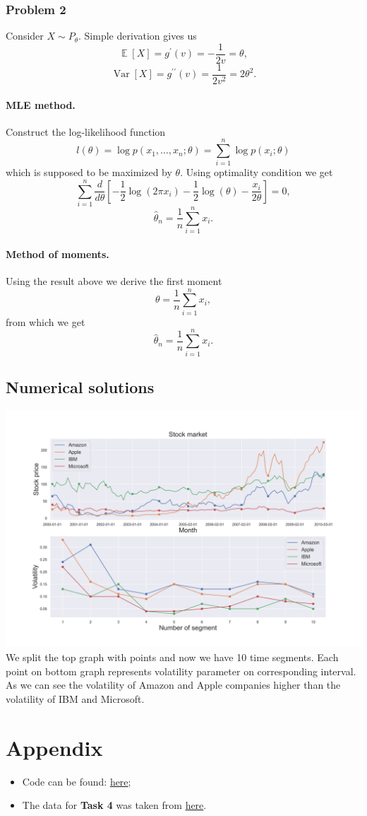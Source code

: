 \documentclass[a4paper, 12pt]{article}
\DeclareMathOperator*{\E}{\mathbb{E}}
\DeclareMathOperator*{\Var}{\text{Var}}
\begin{document}
\subsubsection{Problem 2}
Consider $X \sim P_{\theta}.$ Simple derivation gives us
$$
\E [X] = g^{\prime} (v) = -\dfrac{1}{2  v} = \theta,
$$
$$
\Var [X] = g^{\prime \prime} (v) = \dfrac{1}{2 v^2} = 2 \theta^2.
$$ 
\paragraph{MLE method.} Construct the log-likelihood function
$$
l(\theta) = \log p(x_1, \ldots, x_n; \theta) =  \sum \limits_{i=1}^n \log p(x_i; \theta)
$$
which is supposed to be maximized by $\theta.$
Using optimality condition we get
$$
\sum \limits_{i=1}^n \dfrac{d}{d\theta} \left[-\dfrac{1}{2}\log (2 \pi x_i) - \dfrac{1}{2} \log (\theta) - \dfrac{x_i}{2\theta} \right]  = 0,
$$
$$
\hat{\theta}_n = \dfrac{1}{n} \sum \limits_{i=1}^n x_i.
$$

\paragraph{Method of moments.} Using the result above we derive the first moment
$$
\theta =  \dfrac{1}{n} \sum \limits_{i=1}^n x_i,
$$
from which we get
$$
\hat{\theta}_n = \dfrac{1}{n} \sum \limits_{i=1}^n x_i.
$$

\subsection{Numerical solutions}
\includegraphics[width=\textwidth]{Images/Task4.png}
We split the top graph with points and now we have 10 time segments. Each point on bottom graph represents volatility parameter on corresponding interval. As we can see the volatility of Amazon and Apple companies higher than  the volatility of IBM and Microsoft.

\section{Appendix}
\begin{itemize}
	\item Code can be found: \href{https://github.com/vitomania/ozon/blob/master/stats/hw1/Numerical_solution.ipynb}{here};
	\item The data for \textbf{Task 4} was taken from \href{https://github.com/vega/datalib/blob/master/test/data/stocks.csv}{here}.
\end{itemize}
\end{document}
